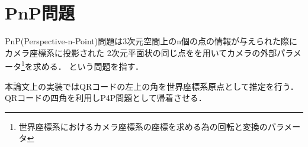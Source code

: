 \section{PnP問題}
PnP(Perspective-n-Point)問題は3次元空間上のn個の点の情報が与えられた際にカメラ座標系に投影された
2次元平面状の同じ点をを用いてカメラの外部パラメータ\footnote{世界座標系におけるカメラ座標系の座標を求める為の回転と変換のパラメータ}を求める．
という問題を指す．

本論文上の実装ではQRコードの左上の角を世界座標系原点として推定を行う．
QRコードの四角を利用しP4P問題として帰着させる．
